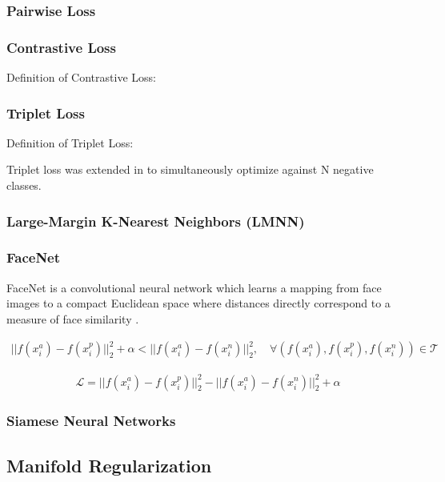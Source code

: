 	\subsubsection{Pairwise Loss}
	
	\subsubsection{Contrastive Loss}
	Definition of Contrastive Loss:
	
	
	\subsubsection{Triplet Loss}
	
	Definition of Triplet Loss:
	
	Triplet loss was extended in \cite{Sohn2016NPairLoss} to simultaneously optimize against N negative classes.

		\subsubsection{Large-Margin K-Nearest Neighbors (LMNN)}
		
		\subsubsection{FaceNet}
		
		FaceNet is a convolutional neural network which learns a mapping from face images to a compact Euclidean space where distances directly correspond to a measure of face similarity \cite{Schroff2015FaceNet}. 
		
		\begin{align}
			||f(x^{a}_{i}) - f(x^{p}_{i})||^{2}_{2} + \alpha < ||f(x^{a}_{i}) - f(x^{n}_{i})||^{2}_{2}, \quad \forall (f(x^{a}_{i}),f(x^{p}_{i}),f(x^{n}_{i})) \in \mathcal{T}
		\end{align} 
	
		\begin{align}
			\mathcal{L} = ||f(x^{a}_{i}) - f(x^{p}_{i})||^{2}_{2} -||f(x^{a}_{i}) - f(x^{n}_{i})||^{2}_{2} + \alpha
		\end{align}
		
		
		\subsubsection{Siamese Neural Networks}
	
	\subsection{Manifold Regularization}
	
